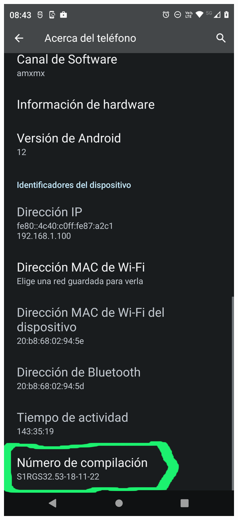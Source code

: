 \begin{frame}
\begin{columns}
\begin{center}
\end{center}
\begin{center}
\includegraphics[width=0.95\linewidth]{01_Configurar/ModoDesarrollador4.png}    
\end{center}


\end{columns}

\end{frame}


